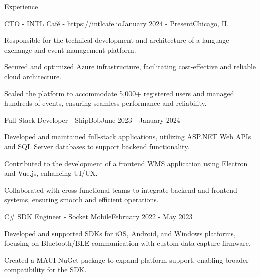 \documentclass[
	10pt, %
]{resume} %
\begin{document}

\begin{rSection}{Experience}

	\begin{rSubsection}{CTO - INTL Café - \url{https://intlcafe.io}}{January 2024 - Present}{}{Chicago, IL}
		\item Responsible for the technical development and architecture of a language exchange and event management platform.
		\item Secured and optimized Azure infrastructure, facilitating cost-effective and reliable cloud architecture.
		\item Scaled the platform to accommodate 5,000+ registered users and managed hundreds of events, ensuring seamless performance and reliability.		
	\end{rSubsection}


	\begin{rSubsection}{Full Stack Developer - ShipBob}{June 2023 - January 2024}{}{}
		\item Developed and maintained full-stack applications, utilizing ASP.NET Web APIs and SQL Server databases to support backend functionality.
		\item Contributed to the development of a frontend WMS application using Electron and Vue.js, enhancing UI/UX.
		\item Collaborated with cross-functional teams to integrate backend and frontend systems, ensuring smooth and efficient operations.	
	\end{rSubsection}


	\begin{rSubsection}{C\# SDK Engineer - Socket Mobile}{February 2022 - May 2023}{}{}
		\item Developed and supported SDKs for iOS, Android, and Windows platforms, focusing on Bluetooth/BLE communication with custom data capture firmware.
		\item Created a MAUI NuGet package to expand platform support, enabling broader compatibility for the SDK.
	\end{rSubsection}



\end{rSection}
\end{document}

